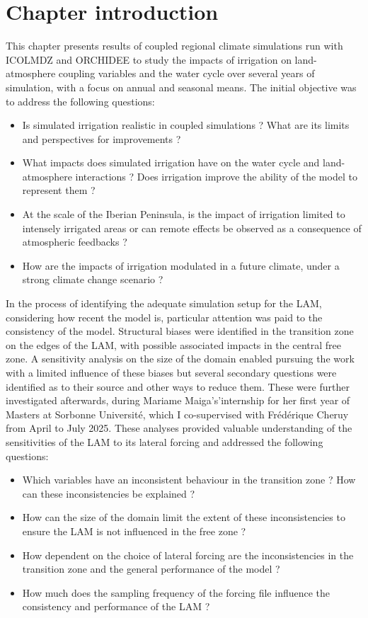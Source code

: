 \section{Chapter introduction}

This chapter presents results of coupled regional climate simulations run with ICOLMDZ and ORCHIDEE to study the impacts of irrigation on land-atmosphere coupling variables and the water cycle over several years of simulation, with a focus on annual and seasonal means. The initial objective was to address the following questions:
\begin{itemize}
    \item Is simulated irrigation realistic in coupled simulations ? What are its limits and perspectives for improvements ?
    \item What impacts does simulated irrigation have on the water cycle and land-atmosphere interactions ? Does irrigation improve the ability of the model to represent them ?
    \item At the scale of the Iberian Peninsula, is the impact of irrigation limited to intensely irrigated areas or can remote effects be observed as a consequence of atmospheric feedbacks ?
    \item How are the impacts of irrigation modulated in a future climate, under a strong climate change scenario ?
\end{itemize}

In the process of identifying the adequate simulation setup for the LAM, considering how recent the model is, particular attention was paid to the consistency of the model. Structural biases were identified in the transition zone on the edges of the LAM, with possible associated impacts in the central free zone. A sensitivity analysis on the size of the domain enabled pursuing the work with a limited influence of these biases but several secondary questions were identified as to their source and other ways to reduce them. These were further investigated afterwards, during Mariame Maiga's'internship for her first year of Masters at Sorbonne Université, which I co-supervised with Frédérique Cheruy from April to July 2025. 
These analyses provided valuable understanding of the sensitivities of the LAM to its lateral forcing and addressed the following questions: 
\begin{itemize}
    \item Which variables have an inconsistent behaviour in the transition zone ? How can these inconsistencies be explained ?
    \item How can the size of the domain limit the extent of these inconsistencies to ensure the LAM is not influenced in the free zone ?
    \item How dependent on the choice of lateral forcing are the inconsistencies in the transition zone and the general performance of the model ?
    \item How much does the sampling frequency of the forcing file influence the consistency and performance of the LAM ?
\end{itemize}

